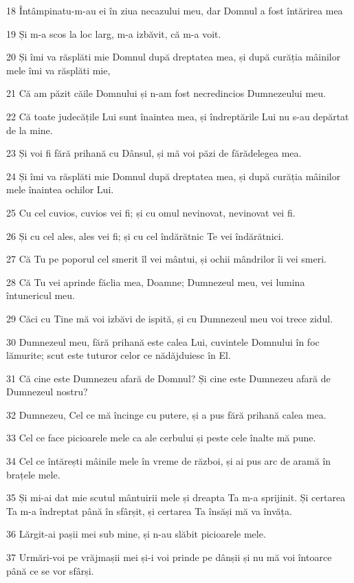 \par 18 Întâmpinatu-m-au ei în ziua necazului meu, dar Domnul a fost întărirea mea
\par 19 Și m-a scos la loc larg, m-a izbăvit, că m-a voit.
\par 20 Și îmi va răsplăti mie Domnul după dreptatea mea, și după curăția mâinilor mele îmi va răsplăti mie,
\par 21 Că am păzit căile Domnului și n-am fost necredincios Dumnezeului meu.
\par 22 Că toate judecățile Lui sunt înaintea mea, și îndreptările Lui nu s-au depărtat de la mine.
\par 23 Și voi fi fără prihană cu Dânsul, și mă voi păzi de fărădelegea mea.
\par 24 Și îmi va răsplăti mie Domnul după dreptatea mea, și după curăția mâinilor mele înaintea ochilor Lui.
\par 25 Cu cel cuvios, cuvios vei fi; și cu omul nevinovat, nevinovat vei fi.
\par 26 Și cu cel ales, ales vei fi; și cu cel îndărătnic Te vei îndărătnici.
\par 27 Că Tu pe poporul cel smerit îl vei mântui, și ochii mândrilor îi vei smeri.
\par 28 Că Tu vei aprinde făclia mea, Doamne; Dumnezeul meu, vei lumina întunericul meu.
\par 29 Căci cu Tine mă voi izbăvi de ispită, și cu Dumnezeul meu voi trece zidul.
\par 30 Dumnezeul meu, fără prihană este calea Lui, cuvintele Domnului în foc lămurite; scut este tuturor celor ce nădăjduiesc în El.
\par 31 Că cine este Dumnezeu afară de Domnul? Și cine este Dumnezeu afară de Dumnezeul nostru?
\par 32 Dumnezeu, Cel ce mă încinge cu putere, și a pus fără prihană calea mea.
\par 33 Cel ce face picioarele mele ca ale cerbului și peste cele înalte mă pune.
\par 34 Cel ce întărești mâinile mele în vreme de război, și ai pus arc de aramă în brațele mele.
\par 35 Și mi-ai dat mie scutul mântuirii mele și dreapta Ta m-a sprijinit. Și certarea Ta m-a îndreptat până în sfârșit, și certarea Ta însăși mă va învăța.
\par 36 Lărgit-ai pașii mei sub mine, și n-au slăbit picioarele mele.
\par 37 Urmări-voi pe vrăjmașii mei și-i voi prinde pe dânșii și nu mă voi întoarce până ce se vor sfârși.

